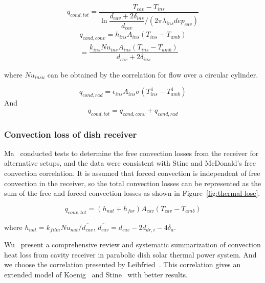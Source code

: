 \documentclass{article}
\begin{document}
\begin{equation*}
	q_{cond,tot}=\dfrac{T_{cav}-T_{ins}}{\ln\dfrac{d_{cav}+2\delta_{ins}}{d_{cav}}/(2\pi\lambda_{ins}dep_{cav})}
\end{equation*}
\begin{equation*}
\begin{split}
	q_{cond,conv}=h_{ins}A_{ins}(T_{ins}-T_{amb})
	\\=\dfrac{k_{ins}Nu_{ins}A_{ins}(T_{ins}-T_{amb})}{d_{cav}+2\delta_{ins}}
\end{split}
\end{equation*}

where $Nu_{insu}$ can be obtained by the correlation for flow over a circular cylinder.~\cite{Churchill1977} 

\begin{equation*}
	q_{cond,rad}=\epsilon_{ins}A_{ins}\sigma(T_{ins}^4 - T_{amb}^4)	
\end{equation*}
And 
\begin{equation*}
	q_{cond,tot}=q_{cond,conv}+q_{cond,rad}	
\end{equation*}

\subsubsection{Convection loss of dish receiver}
Ma~\cite{Ma1993} conducted tests to determine the free convection losses from the receiver for alternative setups, and the data were consistent with Stine and McDonald's free convection correlation. It is assumed that forced convection is independent of free convection in the receiver, so the total convection losses can be represented as the sum of the free and forced convection losses as shown in Figure~\ref{fig:thermal-lose}.

\begin{equation*}
	q_{conv,tot} = (h_{nat} + h_{for})A_{cav}(T_{cav}-T_{amb})
\end{equation*}

where $h_{nat}=k_{film}Nu_{nat}/\overline{d_{cav}}$, $\overline{d_{cav}}=d_{cav}-2d_{dr,i}-4 \delta_a$.

Wu~\cite{Wu2010} present a comprehensive review and systematic summarization of convection heat loss from cavity receiver in parabolic dish solar thermal power system. And we choose the correlation presented by Leibfried~\cite{Leibfried1995}. This correlation gives an extended model of Koenig~\cite{Koenig1981} and Stine~\cite{Stine1994} with better results.
\end{document}
